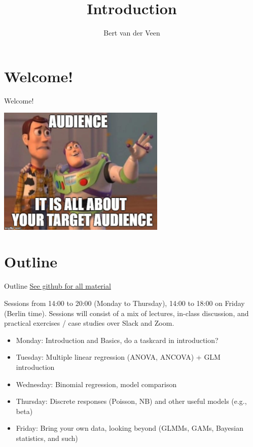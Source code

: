 \documentclass[
  ignorenonframetext,
]{beamer}
\title{Introduction}
\author{Bert van der Veen}
\date{}
\institute{Department of Mathematical Sciences, NTNU}
\providecommand{\tightlist}{%
  \setlength{\itemsep}{0pt}\setlength{\parskip}{0pt}}
\begin{document}
\frame{\titlepage}

\hypertarget{welcome}{%
\section{\texorpdfstring{Welcome!
}{Welcome! }}\label{welcome}}

\begin{frame}{Welcome! }
\center

\includegraphics[width=0.6\textwidth,height=\textheight]{audience.png}
\end{frame}

\hypertarget{outline}{%
\section{Outline}\label{outline}}

\begin{frame}{Outline}
\href{https://github.com/BertvanderVeen/GLM-workshop}{See github for all
material}

Sessions from 14:00 to 20:00 (Monday to Thursday), 14:00 to 18:00 on
Friday (Berlin time). Sessions will consist of a mix of lectures,
in-class discussion, and practical exercises / case studies over Slack
and Zoom.

\begin{itemize}
\tightlist
\item
  Monday: Introduction and Basics, do a taskcard in introduction?
\item
  Tuesday: Multiple linear regression (ANOVA, ANCOVA) + GLM introduction
\item
  Wednesday: Binomial regression, model comparison
\item
  Thursday: Discrete responses (Poisson, NB) and other useful models
  (e.g., beta)
\item
  Friday: Bring your own data, looking beyond (GLMMs, GAMs, Bayesian
  statistics, and such)
\end{itemize}
\end{frame}
\end{document}
